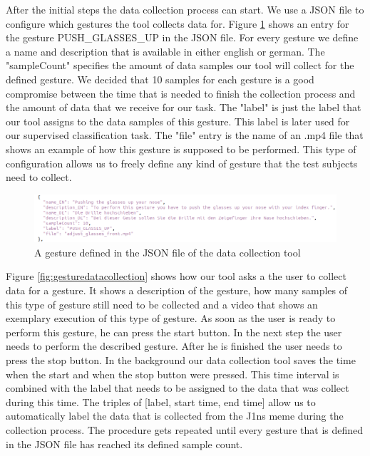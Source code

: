 \documentclass[runningheads]{llncs}
\begin{document}
After the initial steps the data collection process can start. We use a JSON file to configure which gestures the tool collects data for. Figure \ref{fig:gesturejson} shows an entry for the gesture PUSH\_GLASSES\_UP in the JSON file. For every gesture we define a name and description that is available in either english or german. The "sampleCount" specifies the amount of data samples our tool will collect for the defined gesture. We decided that 10 samples for each gesture is a good compromise between the time that is needed to finish the collection process and the amount of data that we receive for our task. The "label" is just the label that our tool assigns to the data samples of this gesture. This label is later used for our supervised classification task. The "file" entry is the name of an .mp4 file that shows an example of how this gesture is supposed to be performed. This type of configuration allows us to freely define any kind of gesture that the test subjects need to collect.
\begin{figure}
\centering
\centerline{\includegraphics[width=\textwidth]{GestureJSON.png}}
\caption{A gesture defined in the JSON file of the data collection tool}
\label{fig:gesturejson}
\end{figure}
Figure \ref{fig:gesturedatacollection} shows how our tool asks a the user to collect data for a gesture. It shows a description of the gesture, how many samples of this type of gesture still need to be collected and a video that shows an exemplary execution of this type of gesture. As soon as the user is ready to perform this gesture, he can press the start button. In the next step the user needs to perform the described gesture. After he is finished the user needs to press the stop button. In the background our data collection tool saves the time when the start and when the stop button were pressed. This time interval is combined with the label that needs to be assigned to the data that was collect during this time. The triples of [label, start time, end time] allow us to automatically label the data that is collected from the J1ns meme during the collection process. The procedure gets repeated until every gesture that is defined in the JSON file has reached its defined sample count.
\end{document}
